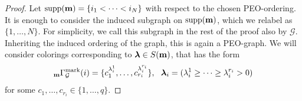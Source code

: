 \documentclass[11pt,reqno]{amsart}
\numberwithin{equation}{section} %
\theoremstyle{definition}
\theoremstyle{remark}
\numberwithin{equation}{section}
\begin{document}
        \begin{proof}

           
     Let $\mathrm{supp}(\bold{m})=\{i_1<\dots<i_N\}$ with respect to the chosen PEO-ordering. It is enough to consider the induced subgraph on  $\mathrm{supp}(\bold{m})$, which we relabel as $\{1,\dots,N\}$. For simplicity, we call this subgraph in the rest of the proof also by $\mathcal{G}$. Inheriting the induced ordering of the graph, this is again a PEO-graph. We will consider colorings corresponding to $\boldsymbol{\lambda}\in S(\bold m)$, that has the form  
     \begin{equation}\label{form}{_{\bold{m}}\Gamma^{\mathrm{mark}}_\mathcal{G}}(i)=\{c_1^{\lambda^1_i},\dots,c_{r_i}^{\lambda^{r_i}_i}\},\ \text{ $\boldsymbol{\lambda}_i=(\lambda^1_i\ge \cdots \ge \lambda^{r_i}_i>0)$}\end{equation}
     for some $c_1,\dots,c_{r_i}\in\{1,\dots,q\}.$
     

\end{proof}
\end{document}
